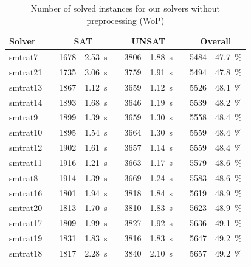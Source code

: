 \begin{table}[]
    \caption{Number of solved instances for our solvers without preprocessing (WoP)}
    \centering
    \begin{tabularx}{\textwidth}{lXrrXrrXrr}
    	\toprule
    	\textbf{Solver}
    	&& \multicolumn{2}{c}{\textbf{SAT}}
    	&& \multicolumn{2}{c}{\textbf{UNSAT}}
    	&& \multicolumn{2}{c}{\textbf{Overall}}
    	\\
    	\midrule
    	\rowcolor{black!20}
    	smtrat7
    	&& 1678 & 2.53~s
    	&& 3806 & 1.88~s
    	&& 5484 & 47.7~\%
    	\\ 
    	\rowcolor{black!20}
    	smtrat21
    	&& 1735 & 3.06~s
    	&& 3759 & 1.91~s
    	&& 5494 & 47.8~\%
    	\\
    	\rowcolor{red!20}
    	smtrat13
    	&& 1867 & 1.12~s
    	&& 3659 & 1.12~s
    	&& 5526 & 48.1~\%
    	\\
    	\rowcolor{red!20}
    	smtrat14
    	&& 1893 & 1.68~s
    	&& 3646 & 1.19~s
    	&& 5539 & 48.2~\%
    	\\
    	\rowcolor{red!20}
    	smtrat9
    	&& 1899 & 1.39~s
    	&& 3659 & 1.30~s
    	&& 5558 & 48.4~\%
    	\\
    	\rowcolor{red!20}
    	smtrat10
    	&& 1895 & 1.54~s
    	&& 3664 & 1.30~s
    	&& 5559 & 48.4~\%
    	\\
    	\rowcolor{red!20}
    	smtrat12
    	&& 1902 & 1.61~s
    	&& 3657 & 1.14~s
    	&& 5559 & 48.4~\%
    	\\
    	\rowcolor{red!20}
    	smtrat11
    	&& 1916 & 1.21~s
    	&& 3663 & 1.17~s
    	&& 5579 & 48.6~\%
    	\\
    	\rowcolor{red!20}
    	smtrat8
    	&& 1914 & 1.39~s
    	&& 3669 & 1.24~s
    	&& 5583 & 48.6~\%
    	\\
    	\rowcolor{blue!20}
    	smtrat16
    	&& 1801 & 1.94~s
    	&& 3818 & 1.84~s
    	&& 5619 & 48.9~\%
    	\\
    	\rowcolor{blue!20}
    	smtrat20
    	&& 1813 & 1.70~s
    	&& 3810 & 1.83~s
    	&& 5623 & 48.9~\%
    	\\
    	\rowcolor{blue!20}
    	smtrat17
    	&& 1809 & 1.99~s
    	&& 3827 & 1.92~s
    	&& 5636 & 49.1~\%
    	\\
    	\rowcolor{blue!20}
    	smtrat19
    	&& 1831 & 1.83~s
    	&& 3816 & 1.83~s
    	&& 5647 & 49.2~\%
    	\\
    	\rowcolor{blue!20}
    	smtrat18
    	&& 1817 & 2.28~s
    	&& 3840 & 2.10~s
    	&& 5657 & 49.2~\%
    	\\

\end{tabularx}
\end{table}
